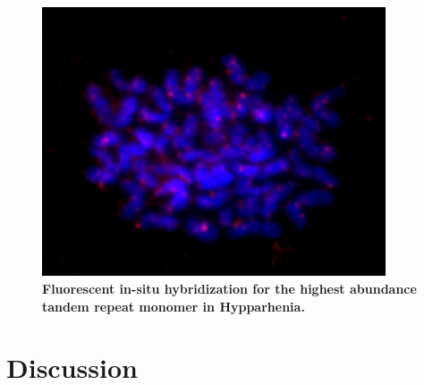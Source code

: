 \documentclass[10pt,letterpaper]{article}
\begin{document}
\begin{figure}[h]
\begin{center}
\includegraphics[width=4in]{Hypdip_TK177-Repet.png}
\end{center}
\caption{{\bf Fluorescent in-situ hybridization for the highest abundance tandem repeat monomer in Hypparhenia.} }
\label{FISH2}
\end{figure}

\section*{Discussion}
\end{document}
